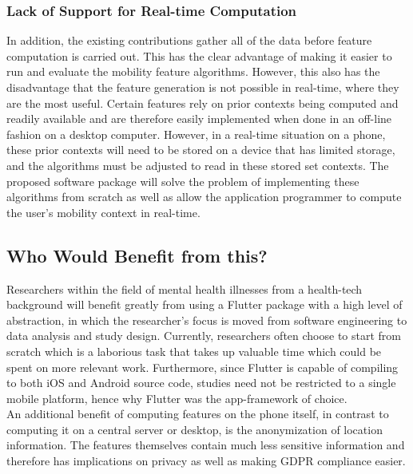 \subsubsection{Lack of Support for Real-time Computation}
In addition, the existing contributions gather all of the data before feature computation is carried out. This has the clear advantage of making it easier to run and evaluate the mobility feature algorithms. However, this also has the disadvantage that the feature generation is not possible in real-time, where they are the most useful. Certain features rely on prior contexts being computed and readily available and are therefore easily implemented when done in an off-line fashion on a desktop computer. However, in a real-time situation on a phone, these prior contexts will need to be stored on a device that has limited storage, and the algorithms must be adjusted to read in these stored set contexts. The proposed software package will solve the problem of implementing these algorithms from scratch as well as allow the application programmer to compute the user's mobility context in real-time.

\subsection{Who Would Benefit from this?}
Researchers within the field of mental health illnesses from a health-tech background will benefit greatly from using a Flutter package with a high level of abstraction, in which the researcher's focus is moved from software engineering to data analysis and study design. Currently, researchers often choose to start from scratch which is a laborious task that takes up valuable time which could be spent on more relevant work. Furthermore, since Flutter is capable of compiling to both iOS and Android source code, studies need not be restricted to a single mobile platform, hence why Flutter was the app-framework of choice.\\

An additional benefit of computing features on the phone itself, in contrast to computing it on a central server or desktop, is the anonymization of location information. The features themselves contain much less sensitive information and therefore has implications on privacy as well as making GDPR compliance easier.